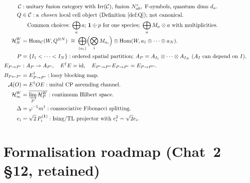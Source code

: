 \documentclass[11pt,a4paper]{article}
\theoremstyle{definition}
\newcommand{\Cc}{\mathcal{C}}
\newcommand{\Hh}{\mathcal{H}}
\newcommand{\Aa}{\mathcal{A}}
\newcommand{\Irr}{\mathrm{Irr}}
\newcommand{\Hom}{\mathrm{Hom}}
\newcommand{\id}{\mathrm{id}}
\newcommand{\one}{\mathbf{1}}
\begin{document}
\begin{tcolorbox}[colback=blue!2!white,colframe=blue!50!black,title=Recapitulation: the principal objects]
\begin{align*}
\Cc &: \text{unitary fusion category with $\Irr(\Cc)$, fusion } N_{ab}^c, \text{ F-symbols, quantum dims } d_a.\\
Q &\in \Cc: \text{a \emph{chosen} local cell object (Definition~\ref{def:Q}); not canonical.}\\
&\phantom{=\;}\text{Common choices: $\bigoplus_a a$; $\one\oplus p$ for one species; }
\bigoplus_a M_a\otimes a\text{ with multiplicities.}\\
\Hh_N^{W} &= \Hom_\Cc(W, Q^{\otimes N})
\;\cong\; \bigoplus_{(a_i)}\Bigl(\bigotimes_i M_{a_i}\Bigr)\otimes\Hom(W, a_1\otimes\cdots\otimes a_N).\\
P &= \{I_1<\cdots<I_N\}: \text{ordered spatial partition; }
A_P = A_{I_1}\otimes\cdots\otimes A_{I_N}\text{ ($A_I$ can depend on $I$).}\\
E_{P\to P'} &: A_P\to A_{P'}, \quad E^{\dagger}E = \id, \quad
E_{P'\to P''}E_{P\to P'}=E_{P\to P''}.\\
B_{P\leftarrow P'} &= E_{P\to P'}^{\dagger}: \text{lossy blocking map}.\\
\Aa(O) &= E^{\dagger}OE: \text{unital CP ascending channel.}\\
\Hh_\infty^{W} &= \overline{\varinjlim_P \Hh_P^{W}}: \text{continuum Hilbert space.}\\
\Delta &= \varphi^{-1}m^{\dagger}: \text{coassociative Fibonacci splitting.}\\
e_i &= \sqrt 2\,P_i^{(\one)}: \text{Ising/TL projector with }
 e_i^2 = \sqrt 2 e_i.
\end{align*}
\end{tcolorbox}

\section{Formalisation roadmap (Chat~2 §12, retained)}
\end{document}
